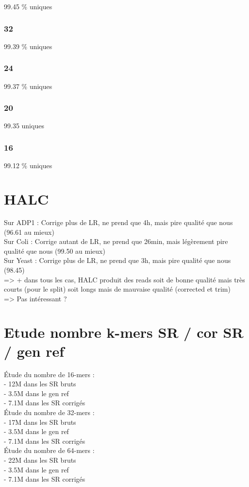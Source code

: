 \documentclass[12pt]{article}
\begin{document}
99.45 \% uniques

\subsubsection{32}

99.39 \% uniques
     
\subsubsection{24}

99.37 \% uniques

\subsubsection{20}

99.35 uniques
     
\subsubsection{16}

99.12 \% uniques


\section{HALC}

Sur ADP1 : Corrige plus de LR, ne prend que 4h, mais pire qualité que nous (96.61 au mieux) \\
Sur Coli : Corrige autant de LR, ne prend que 26min, mais légèrement pire qualité que nous (99.50 au mieux) \\
Sur Yeast : Corrige plus de LR, ne prend que 3h, mais pire qualité que nous (98.45) \\

=> + dans tous les cas, HALC produit des reads soit de bonne qualité mais très courts (pour le split) 
soit longs mais de mauvaise qualité (corrected et trim) \\

=> Pas intéressant ?

\section{Etude nombre k-mers SR / cor SR / gen ref}

Étude du nombre de 16-mers : \\
- 12M dans les SR bruts \\
- 3.5M dans le gen ref \\
- 7.1M dans les SR corrigés \\

Étude du nombre de 32-mers : \\
- 17M dans les SR bruts \\
- 3.5M dans le gen ref \\
- 7.1M dans les SR corrigés \\

Étude du nombre de 64-mers : \\
- 22M dans les SR bruts \\
- 3.5M dans le gen ref \\
- 7.1M dans les SR corrigés \\
\end{document}
